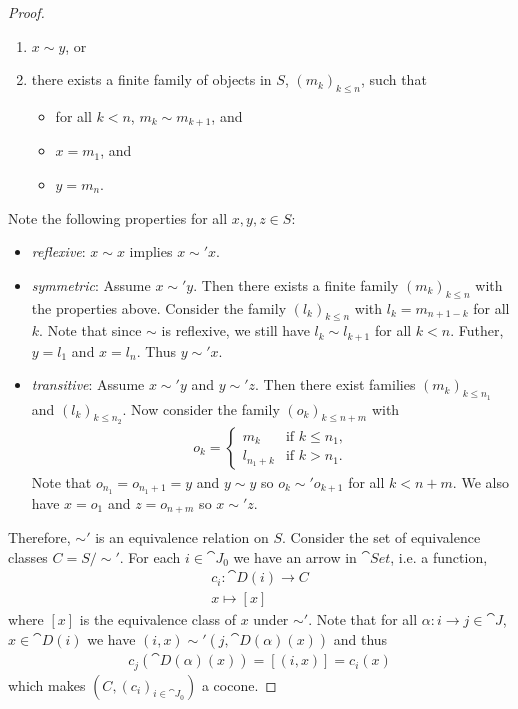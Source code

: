 \documentclass{article}
\begin{document}
\begin{proof}
\begin{enumerate}[label=E\arabic*.]
      \item $x\sim y$, or 
      \item there exists a finite family of objects in $S$, $(m_k)_{k\leq n}$, such that \begin{itemize}
         \item for all $k<n$, $m_k\sim m_{k+1}$, and 
         \item $x=m_1$, and
         \item $y=m_n$.
      \end{itemize}
   \end{enumerate}
   Note the following properties for all $x,y,z\in S$:
   \begin{itemize}
      \item \emph{reflexive}: $x\sim x$ implies $x\sim'x$.
      \item \emph{symmetric}: Assume $x\sim'y$. Then there exists a finite family $(m_k)_{k\leq n}$ with the properties above.
         Consider the family $(l_k)_{k\leq n}$ with $l_k = m_{n+1-k}$ for all $k$. Note that since $\sim$ is reflexive,
         we still have $l_k\sim l_{k+1}$ for all $k<n$. Futher, $y=l_1$ and $x=l_n$. Thus $y\sim'x$.
      \item \emph{transitive}: Assume $x\sim'y$ and $y\sim'z$. Then there exist families $(m_k)_{k\leq n_1}$ and $(l_k)_{k\leq n_2}$.
         Now consider the family $(o_k)_{k\leq n+m}$ with \begin{align*}
            o_k = \begin{cases}
               m_k &\text{if } k\leq n_1,\\
               l_{n_1+k} &\text{if } k > n_1.
            \end{cases}
         \end{align*}
         Note that $o_{n_1}=o_{n_1+1}=y$ and $y\sim y$ so $o_k \sim' o_{k+1}$ for all $k<n+m$. We also have $x=o_1$ and $z=o_{n+m}$ so $x\sim'z$.
   \end{itemize}
   Therefore, $\sim'$ is an equivalence relation on $S$. Consider the set of equivalence classes $C=S/\sim'$.
   For each $i\in\cat J_0$ we have an arrow in $\cat{Set}$, i.e. a function, 
   \begin{align*}
      c_i : \cat D(i) \to C \\
      x \mapsto [x]
   \end{align*}
   where $[x]$ is the equivalence class of $x$ under $\sim'$.
   Note that  for all $\alpha:i\to j\in\cat J$, $x\in \cat D(i)$ we have $(i,x)\sim'(j,\cat D(\alpha)(x))$ and thus
   \begin{align*}
      c_j(\cat D(\alpha)(x)) = [(i,x)] = c_i(x)
   \end{align*}
   which makes $(C, (c_i)_{i\in\cat J_0})$ a cocone.
\end{proof}
\end{document}
